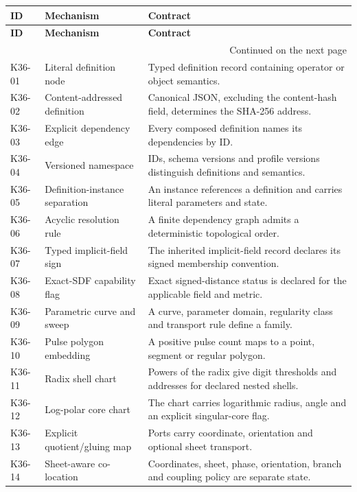 \begin{longtable}{@{}p{}p{}p{}@{}}
\toprule\textbf{ID} & \textbf{Mechanism} & \textbf{Contract}\\\midrule\endfirsthead
\toprule\textbf{ID} & \textbf{Mechanism} & \textbf{Contract}\\\midrule\endhead
\midrule\multicolumn{3}{r}{\small Continued on the next page}\\\endfoot\bottomrule\endlastfoot
K36-01 & Literal definition node & Typed definition record containing operator or object semantics.\\[5pt]
K36-02 & Content-addressed definition & Canonical JSON, excluding the content-hash field, determines the SHA-256 address.\\[5pt]
K36-03 & Explicit dependency edge & Every composed definition names its dependencies by ID.\\[5pt]
K36-04 & Versioned namespace & IDs, schema versions and profile versions distinguish definitions and semantics.\\[5pt]
K36-05 & Definition-instance separation & An instance references a definition and carries literal parameters and state.\\[5pt]
K36-06 & Acyclic resolution rule & A finite dependency graph admits a deterministic topological order.\\[5pt]
K36-07 & Typed implicit-field sign & The inherited implicit-field record declares its signed membership convention.\\[5pt]
K36-08 & Exact-SDF capability flag & Exact signed-distance status is declared for the applicable field and metric.\\[5pt]
K36-09 & Parametric curve and sweep & A curve, parameter domain, regularity class and transport rule define a family.\\[5pt]
K36-10 & Pulse polygon embedding & A positive pulse count maps to a point, segment or regular polygon.\\[5pt]
K36-11 & Radix shell chart & Powers of the radix give digit thresholds and addresses for declared nested shells.\\[5pt]
K36-12 & Log-polar core chart & The chart carries logarithmic radius, angle and an explicit singular-core flag.\\[5pt]
K36-13 & Explicit quotient/gluing map & Ports carry coordinate, orientation and optional sheet transport.\\[5pt]
K36-14 & Sheet-aware co-location & Coordinates, sheet, phase, orientation, branch and coupling policy are separate state.\\[5pt]

\end{longtable}
